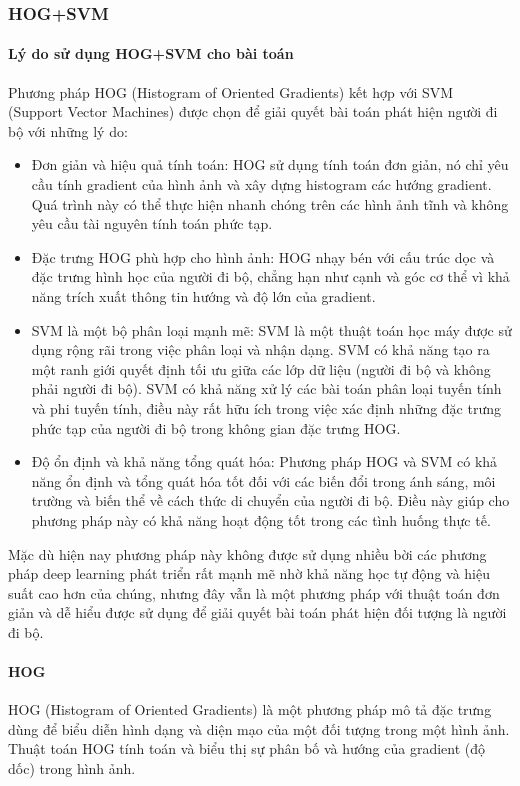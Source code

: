 \subsubsection{HOG+SVM}
\paragraph{Lý do sử dụng HOG+SVM cho bài toán\\}
Phương pháp HOG (Histogram of Oriented Gradients) kết hợp với SVM (Support Vector Machines) được chọn để giải quyết bài toán phát hiện người đi bộ với những lý do:
\begin{itemize}[noitemsep, topsep=0pt, leftmargin=1.25em, label={$-$}]
    \item Đơn giản và hiệu quả tính toán: HOG sử dụng tính toán đơn giản, nó chỉ yêu cầu tính gradient của hình ảnh và xây dựng histogram các hướng gradient. Quá trình này có thể thực hiện nhanh chóng trên các hình ảnh tĩnh và không yêu cầu tài nguyên tính toán phức tạp.
    \item Đặc trưng HOG phù hợp cho hình ảnh: HOG nhạy bén với cấu trúc dọc và đặc trưng hình học của người đi bộ, chẳng hạn như cạnh và góc cơ thể vì khả năng trích xuất thông tin hướng và độ lớn của gradient.
    \item SVM là một bộ phân loại mạnh mẽ: SVM là một thuật toán học máy được sử dụng rộng rãi trong việc phân loại và nhận dạng. SVM có khả năng tạo ra một ranh giới quyết định tối ưu giữa các lớp dữ liệu (người đi bộ và không phải người đi bộ). SVM có khả năng xử lý các bài toán phân loại tuyến tính và phi tuyến tính, điều này rất hữu ích trong việc xác định những đặc trưng phức tạp của người đi bộ trong không gian đặc trưng HOG.
    \item Độ ổn định và khả năng tổng quát hóa\cite{reasontousehogsvm}: Phương pháp HOG và SVM có khả năng ổn định và tổng quát hóa tốt đối với các biến đổi trong ánh sáng, môi trường và biến thể về cách thức di chuyển của người đi bộ. Điều này giúp cho phương pháp này có khả năng hoạt động tốt trong các tình huống thực tế.
\end{itemize}
Mặc dù hiện nay phương pháp này không được sử dụng nhiều bời các phương pháp deep learning phát triển rất mạnh mẽ nhờ khả năng học tự động và hiệu suất cao hơn của chúng, nhưng đây vẫn là một phương pháp với thuật toán đơn giản và dễ hiểu được sử dụng để giải quyết bài toán phát hiện đối tượng là người đi bộ.
\paragraph{HOG\\}
HOG (Histogram of Oriented Gradients) là một phương pháp mô tả đặc trưng dùng để biểu diễn hình dạng và diện mạo của một đối tượng trong một hình ảnh. Thuật toán HOG tính toán và biểu thị sự phân bố và hướng của gradient (độ dốc) trong hình ảnh.  

